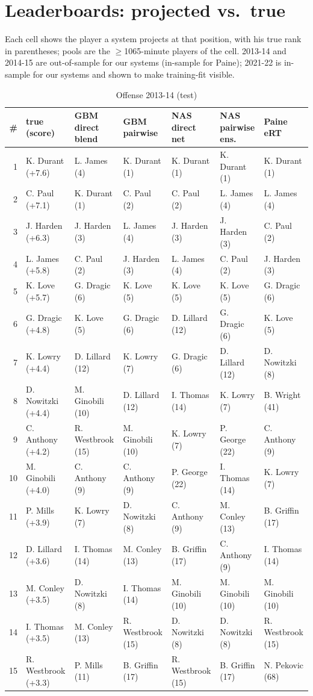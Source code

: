 \documentclass[10pt]{article}
\begin{document}
\section{Leaderboards: projected vs.\ true}
Each cell shows the player a system projects at that position, with his true rank in parentheses; pools are the $\geq$1065-minute players of the cell. 2013-14 and 2014-15 are out-of-sample for our systems (in-sample for Paine); 2021-22 is in-sample for our systems and shown to make training-fit visible.
\begin{table}[ht]\centering\scriptsize
\caption{Offense 2013-14 (test)}
\begin{tabular}{rllllll}
\toprule
\# & true (score) & GBM direct blend & GBM pairwise & NAS direct net & NAS pairwise ens. & Paine eRT \\
\midrule
1 & K. Durant (+7.6) & L. James (4) & K. Durant (1) & K. Durant (1) & K. Durant (1) & K. Durant (1) \\
2 & C. Paul (+7.1) & K. Durant (1) & C. Paul (2) & C. Paul (2) & L. James (4) & L. James (4) \\
3 & J. Harden (+6.3) & J. Harden (3) & L. James (4) & J. Harden (3) & J. Harden (3) & C. Paul (2) \\
4 & L. James (+5.8) & C. Paul (2) & J. Harden (3) & L. James (4) & C. Paul (2) & J. Harden (3) \\
5 & K. Love (+5.7) & G. Dragic (6) & K. Love (5) & K. Love (5) & K. Love (5) & G. Dragic (6) \\
6 & G. Dragic (+4.8) & K. Love (5) & G. Dragic (6) & D. Lillard (12) & G. Dragic (6) & K. Love (5) \\
7 & K. Lowry (+4.4) & D. Lillard (12) & K. Lowry (7) & G. Dragic (6) & D. Lillard (12) & D. Nowitzki (8) \\
8 & D. Nowitzki (+4.4) & M. Ginobili (10) & D. Lillard (12) & I. Thomas (14) & K. Lowry (7) & B. Wright (41) \\
9 & C. Anthony (+4.2) & R. Westbrook (15) & M. Ginobili (10) & K. Lowry (7) & P. George (22) & C. Anthony (9) \\
10 & M. Ginobili (+4.0) & C. Anthony (9) & C. Anthony (9) & P. George (22) & I. Thomas (14) & K. Lowry (7) \\
11 & P. Mills (+3.9) & K. Lowry (7) & D. Nowitzki (8) & C. Anthony (9) & M. Conley (13) & B. Griffin (17) \\
12 & D. Lillard (+3.6) & I. Thomas (14) & M. Conley (13) & B. Griffin (17) & C. Anthony (9) & I. Thomas (14) \\
13 & M. Conley (+3.5) & D. Nowitzki (8) & I. Thomas (14) & M. Ginobili (10) & M. Ginobili (10) & M. Ginobili (10) \\
14 & I. Thomas (+3.5) & M. Conley (13) & R. Westbrook (15) & D. Nowitzki (8) & D. Nowitzki (8) & R. Westbrook (15) \\
15 & R. Westbrook (+3.3) & P. Mills (11) & B. Griffin (17) & R. Westbrook (15) & B. Griffin (17) & N. Pekovic (68) \\
\bottomrule
\end{tabular}
\end{table}
\end{document}
